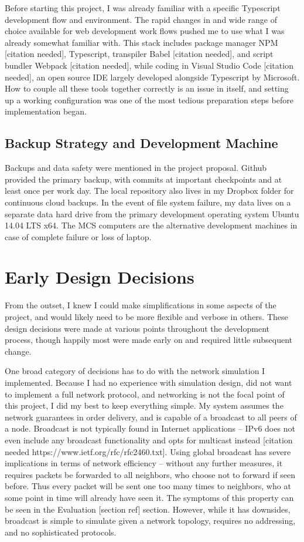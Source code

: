 \documentclass[12pt,a4paper,twoside,openright]{report}
\begin{document}
	Before starting this project, I was already familiar with a specific Typescript development flow and environment. The rapid changes in and wide range of choice available for web development work flows pushed me to use what I was already somewhat familiar with. This stack includes package manager NPM [citation needed], Typescript, transpiler Babel [citation needed], and script bundler Webpack [citation needed], while coding in Visual Studio Code [citation needed], an open source IDE largely developed alongside Typescript by Microsoft. How to couple all these tools together correctly is an issue in itself, and setting up a working configuration was one of the most tedious preparation steps before implementation began.
	
	\subsection{Backup Strategy and Development Machine}
	Backups and data safety were mentioned in the project proposal. Github provided the primary backup, with commits at important checkpoints and at least once per work day. The local repository also lives in my Dropbox folder for continuous cloud backups. In the event of file system failure, my data lives on a separate data hard drive from the primary development operating system Ubuntu 14.04 LTS x64. The MCS computers are the alternative development machines in case of complete failure or loss of laptop.
	
	
\section{Early Design Decisions}
From the outset, I knew I could make simplifications in some aspects of the project, and would likely need to be more flexible and verbose in others. These design decisions were made at various points throughout the development process, though happily most were made early on and required little subsequent change. 

One broad category of decisions has to do with the network simulation I implemented. Because I had no experience with simulation design, did not want to implement a full network protocol, and networking is not the focal point of this project, I did my best to keep everything simple. My system assumes the network guarantees in order delivery, and is capable of a broadcast to all peers of a node. Broadcast is not typically found in Internet applications – IPv6 does not even include any broadcast functionality and opts for multicast instead [citation needed https://www.ietf.org/rfc/rfc2460.txt]. Using global broadcast has severe implications in terms of network efficiency – without any further measures, it requires packets be forwarded to all neighbors, who choose not to forward if seen before. Thus every packet will be sent one too many times to neighbors, who at some point in time will already have seen it. The symptoms of this property can be seen in the Evaluation [section ref] section. However, while it has downsides, broadcast is simple to simulate given a network topology, requires no addressing, and no sophisticated protocols.
\end{document}
